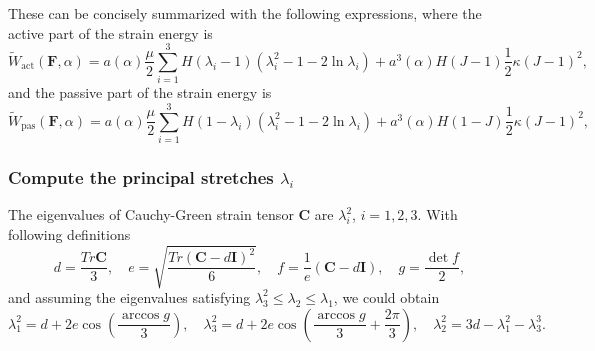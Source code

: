 \documentclass[12pt,3p]{article}
\numberwithin{equation}{section}
\begin{document}
These can be concisely summarized with the following expressions, where the active part of the strain energy is
\begin{equation}
\widetilde{W}_\text{act}\left(\mathbf{F},\alpha\right)=a(\alpha)\frac{\mu}{2}\sum_{i=1}^{3}H(\lambda_i-1)\left(\lambda_i^2-1-2\ln\lambda_i\right) + a^3(\alpha)H(J-1)\frac{1}{2}\kappa\left(J-1\right)^2,
\end{equation}
and the passive part of the strain energy is
\begin{equation}
\widetilde{W}_\text{pas}\left(\mathbf{F},\alpha\right)=a(\alpha)\frac{\mu}{2}\sum_{i=1}^{3}H(1-\lambda_i)\left(\lambda_i^2-1-2\ln\lambda_i\right) + a^3(\alpha)H(1-J)\frac{1}{2}\kappa\left(J-1\right)^2,
\end{equation}

\subsubsection{Compute the principal stretches $\lambda_i$} 
The eigenvalues of Cauchy-Green strain tensor $\mathbf{C}$ are $\lambda_i^2$, $i=1,2,3$.
With following definitions 
\begin{equation}
d=\frac{ Tr {\mathbf{C}}}{3},\quad e= \sqrt{\frac{ Tr { (\mathbf{C}-d\mathbf{I} )^2}}{6}},\quad
f=\frac{1}{e}\left(\mathbf{C}-d\mathbf{I}\right),\quad g=\frac{\det{f}}{2},
\end{equation}
and assuming the eigenvalues satisfying $\lambda_3^2\le\lambda_2\le\lambda_1$, we could obtain \citep{smith1961eigenvalues}
\begin{equation}
\lambda_1^2 = d +2e\cos\left(\frac{\arccos g}{3}\right), \quad \lambda_3^2 = d +2e\cos\left(\frac{\arccos g}{3}+\frac{2\pi}{3}\right), \quad \lambda_2^2 = 3d -\lambda_1^2 -\lambda_3^3.
\end{equation}
\end{document}

